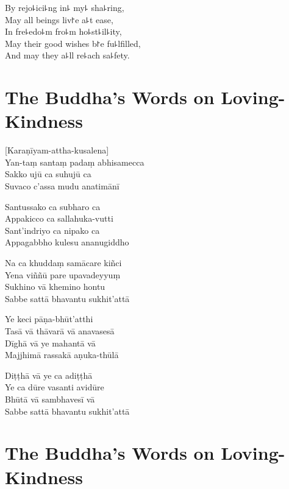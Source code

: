 \begin{english}
  By rejo꜕ici꜕ng in꜕ my꜕ sha꜕ring,\\
  May all beings liv꜓e a꜕t ease,\\
  In fre꜕edo꜕m fro꜕m ho꜕st꜕il꜕ity,\\
  May their good wishes b꜓e fu꜕lfilled,\\
  And may they a꜕ll re꜕ach sa꜕fety.
\end{english}

\chapter*[Loving-Kindness]{The Buddha's Words on Loving-Kindness}%

\delegateSetUseNext


\begin{leader}
\end{leader}

[Karaṇīyam-attha-kusalena]\\
Yan-taṃ santaṃ padaṃ abhisamecca\\
Sakko ujū ca suhujū ca\\
Suvaco c'assa mudu anatimānī

Santussako ca subharo ca\\
Appakicco ca sallahuka-vutti\\
Sant'indriyo ca nipako ca\\
Appagabbho kulesu ananugiddho

Na ca khuddaṃ samācare kiñci\\
Yena viññū pare upavadeyyuṃ\\
Sukhino vā khemino hontu\\
Sabbe sattā bhavantu sukhit'attā

Ye keci pāṇa-bhūt'atthi\\
Tasā vā thāvarā vā anavasesā\\
Dīghā vā ye mahantā vā\\
Majjhimā rassakā aṇuka-thūlā

Diṭṭhā vā ye ca adiṭṭhā\\
Ye ca dūre vasanti avidūre\\
Bhūtā vā sambhavesī vā\\
Sabbe sattā bhavantu sukhit'attā

\chapter[Loving-Kindness]{The Buddha's Words on Loving-Kindness}%

